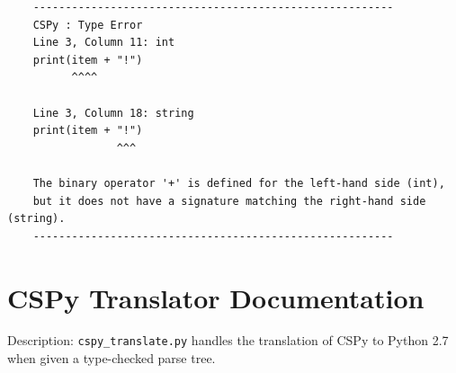 \documentclass{article}
\begin{document}
\begin{itemize}
\begin{verbatim}
    --------------------------------------------------------
    CSPy : Type Error
    Line 3, Column 11: int
    print(item + "!")
          ^^^^

    Line 3, Column 18: string
    print(item + "!")
                 ^^^

    The binary operator '+' is defined for the left-hand side (int),
    but it does not have a signature matching the right-hand side (string).
    --------------------------------------------------------
\end{verbatim}
\end{itemize}
\pagebreak

\section{CSPy Translator Documentation}
Description: \verb|cspy_translate.py| handles the translation of CSPy to Python 2.7 when given a type-checked parse tree.
\end{document}

